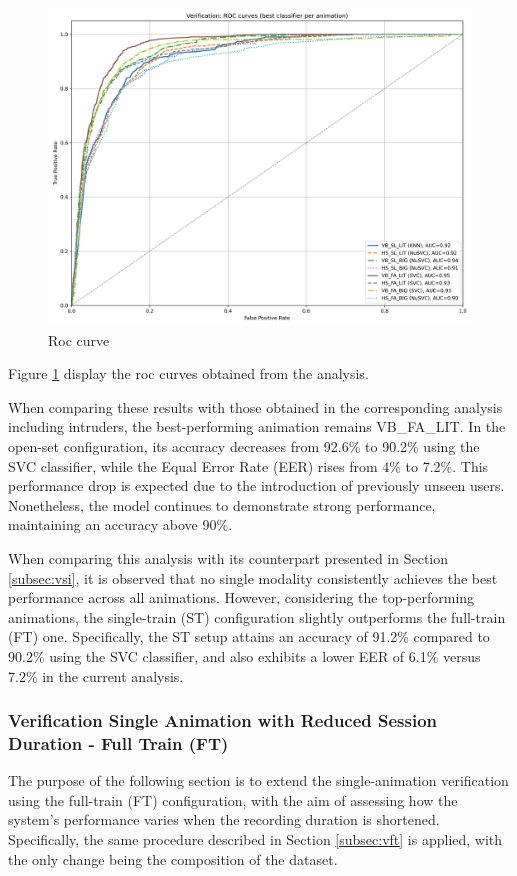 \documentclass{article}
\begin{document}
\begin{figure}[ht]
    \centering
    \includegraphics[width = 0.6
    \textwidth]{Images/Results/Verification_single_intruders/ft/best_animation_roc_curves_ft.png}
    \caption{Roc curve}
    \label{fig:roc_fti}
\end{figure}

Figure \ref{fig:roc_fti} display the roc curves obtained from the analysis.

When comparing these results with those obtained in the corresponding analysis including intruders, the best-performing animation remains VB\_FA\_LIT. 
In the open-set configuration, its accuracy decreases from 92.6\% to 90.2\% using the SVC classifier, while the Equal Error Rate (EER) rises from 4\% to 7.2\%. 
This performance drop is expected due to the introduction of previously unseen users. 
Nonetheless, the model continues to demonstrate strong performance, maintaining an accuracy above 90\%.

When comparing this analysis with its counterpart presented in Section \ref{subsec:vsi}, it is observed that no single modality consistently achieves the best performance across all animations. 
However, considering the top-performing animations, the single-train (ST) configuration slightly outperforms the full-train (FT) one. 
Specifically, the ST setup attains an accuracy of 91.2\% compared to 90.2\% using the SVC classifier, and also exhibits a lower EER of 6.1\% versus 7.2\% in the current analysis.
\FloatBarrier

\subsubsection{Verification Single Animation with Reduced Session Duration - Full Train (FT)}

The purpose of the following section is to extend the single-animation verification using the full-train (FT) configuration, with the aim of assessing how the system’s performance varies when the recording duration is shortened. 
Specifically, the same procedure described in Section \ref{subsec:vft} is applied, with the only change being the composition of the dataset.
\end{document}
